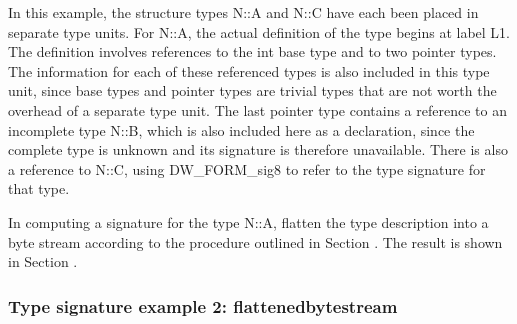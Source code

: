 In this example, the structure types N::A and N::C have each
been placed in separate type units.  For N::A, the actual
definition of the type begins at label L1. The definition
involves references to the int base type and to two pointer
types. The information for each of these referenced types is
also included in this type unit, since base types and pointer
types are trivial types that are not worth the overhead of a
separate type unit. The last pointer type contains a reference
to an incomplete type N::B, which is also included here as
a declaration, since the complete type is unknown and its
signature is therefore unavailable. There is also a reference
to N::C, using DW\_FORM\_sig8 to refer to the type signature
for that type.

In computing a signature for the type N::A, flatten the type
description into a byte stream according to the procedure
outlined in 
Section .
The result is shown in 
Section .

\subsubsection{Type signature example 2: flattenedbytestream}
\label{app:typesignatureexample2flattenedbytestream}


